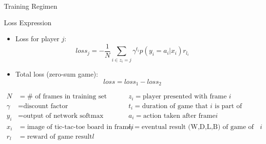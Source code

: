 \documentclass[11pt]{beamer}
\begin{document}
\begin{frame}{Training Regimen}

\end{frame}

\begin{frame}{Loss Expression}
	\begin{itemize}
		\item Loss for player $j$:
		\begin{equation}
		loss_j = -\frac{1}{N} \sum_{i \in z_i=j} \gamma^{t_i} p(y_i=a_i|x_i) r_{l_i} 
		\end{equation}
		\item Total loss (zero-sum game):
		\begin{equation}
		loss = loss_1 - loss_2
		\end{equation}
	\end{itemize}
	
	\begin{align*}
		N &= \#\text{ of frames in training set} \qquad &z_i = \text{player presented with frame } i \\
		\gamma &= \text{discount factor} \qquad &t_i = \text{duration of game that } i \text{ is part of} \\
		y_i &= \text{output of network softmax} \qquad &a_i = \text{action taken after frame} i \\
		x_i &= \text{image of tic-tac-toe board in frame} i \qquad &l_i = \text{eventual result (W,D,L,B) of game of frame} i \\
		r_l &= \text{reward of game result} l
	\end{align*}

	
\end{frame}
\end{document}
